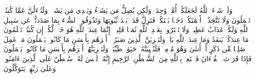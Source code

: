 وَلَوۡ شَاۤءَ ٱللَّهُ لَجَعَلَكُمۡ أُمَّةࣰ وَٰحِدَةࣰ وَلَٰكِن یُضِلُّ مَن یَشَاۤءُ وَیَهۡدِی مَن یَشَاۤءُۚ وَلَتُسۡءَلُنَّ عَمَّا كُنتُمۡ تَعۡمَلُونَ%
\stopbuffer%
\startbuffer[\q:16:94]
وَلَا تَتَّخِذُوۤا۟ أَیۡمَٰنَكُمۡ دَخَلَۢا بَیۡنَكُمۡ فَتَزِلَّ قَدَمُۢ بَعۡدَ ثُبُوتِهَا وَتَذُوقُوا۟ ٱلسُّوۤءَ بِمَا صَدَدتُّمۡ عَن سَبِیلِ ٱللَّهِ وَلَكُمۡ عَذَابٌ عَظِیمࣱ%
\stopbuffer%
\startbuffer[\q:16:95]
وَلَا تَشۡتَرُوا۟ بِعَهۡدِ ٱللَّهِ ثَمَنࣰا قَلِیلًاۚ إِنَّمَا عِندَ ٱللَّهِ هُوَ خَیۡرࣱ لَّكُمۡ إِن كُنتُمۡ تَعۡلَمُونَ%
\stopbuffer%
\startbuffer[\q:16:96]
مَا عِندَكُمۡ یَنفَدُ وَمَا عِندَ ٱللَّهِ بَاقࣲۗ وَلَنَجۡزِیَنَّ ٱلَّذِینَ صَبَرُوۤا۟ أَجۡرَهُم بِأَحۡسَنِ مَا كَانُوا۟ یَعۡمَلُونَ%
\stopbuffer%
\startbuffer[\q:16:97]
مَنۡ عَمِلَ صَٰلِحࣰا مِّن ذَكَرٍ أَوۡ أُنثَىٰ وَهُوَ مُؤۡمِنࣱ فَلَنُحۡیِیَنَّهُۥ حَیَوٰةࣰ طَیِّبَةࣰۖ وَلَنَجۡزِیَنَّهُمۡ أَجۡرَهُم بِأَحۡسَنِ مَا كَانُوا۟ یَعۡمَلُونَ%
\stopbuffer%
\startbuffer[\q:16:98]
فَإِذَا قَرَأۡتَ ٱلۡقُرۡءَانَ فَٱسۡتَعِذۡ بِٱللَّهِ مِنَ ٱلشَّیۡطَٰنِ ٱلرَّجِیمِ%
\stopbuffer%
\startbuffer[\q:16:99]
إِنَّهُۥ لَیۡسَ لَهُۥ سُلۡطَٰنٌ عَلَى ٱلَّذِینَ ءَامَنُوا۟ وَعَلَىٰ رَبِّهِمۡ یَتَوَكَّلُونَ%
\stopbuffer%
